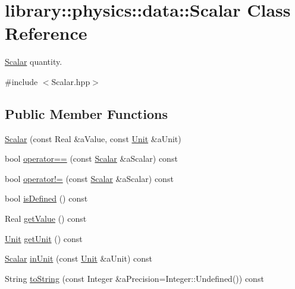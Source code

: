 \hypertarget{classlibrary_1_1physics_1_1data_1_1_scalar}{}\section{library\+:\+:physics\+:\+:data\+:\+:Scalar Class Reference}
\label{classlibrary_1_1physics_1_1data_1_1_scalar}


\hyperlink{classlibrary_1_1physics_1_1data_1_1_scalar}{Scalar} quantity.  




{\ttfamily \#include $<$Scalar.\+hpp$>$}

\subsection*{Public Member Functions}
\begin{DoxyCompactItemize}
\item 
\hyperlink{classlibrary_1_1physics_1_1data_1_1_scalar_a74eb4ae24361e598b0c6dba07e07e0ab}{Scalar} (const Real \&a\+Value, const \hyperlink{classlibrary_1_1physics_1_1_unit}{Unit} \&a\+Unit)
\item 
bool \hyperlink{classlibrary_1_1physics_1_1data_1_1_scalar_ac0fb52b6bbd060663b80fca6419f8029}{operator==} (const \hyperlink{classlibrary_1_1physics_1_1data_1_1_scalar}{Scalar} \&a\+Scalar) const
\item 
bool \hyperlink{classlibrary_1_1physics_1_1data_1_1_scalar_a21521c20348f506b8d6e55a7c775bb89}{operator!=} (const \hyperlink{classlibrary_1_1physics_1_1data_1_1_scalar}{Scalar} \&a\+Scalar) const
\item 
bool \hyperlink{classlibrary_1_1physics_1_1data_1_1_scalar_a2081dc2ad1ddbb135c5400a9cbf8476c}{is\+Defined} () const
\item 
Real \hyperlink{classlibrary_1_1physics_1_1data_1_1_scalar_a20d368d0e67a3bdf77e08538794a3de3}{get\+Value} () const
\item 
\hyperlink{classlibrary_1_1physics_1_1_unit}{Unit} \hyperlink{classlibrary_1_1physics_1_1data_1_1_scalar_a1be1780385e166344709b37e011949e1}{get\+Unit} () const
\item 
\hyperlink{classlibrary_1_1physics_1_1data_1_1_scalar}{Scalar} \hyperlink{classlibrary_1_1physics_1_1data_1_1_scalar_a252882c984e9be8778bff0f0b1e7d47b}{in\+Unit} (const \hyperlink{classlibrary_1_1physics_1_1_unit}{Unit} \&a\+Unit) const
\item 
String \hyperlink{classlibrary_1_1physics_1_1data_1_1_scalar_a7d961b28c2a0cbd32e8ccee06cc61aaa}{to\+String} (const Integer \&a\+Precision=Integer\+::\+Undefined()) const
\end{DoxyCompactItemize}
